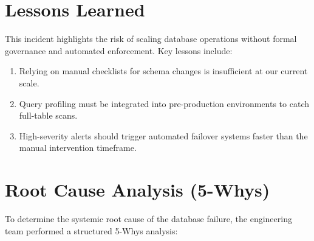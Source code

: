 \documentclass[11pt,a4paper]{article}
\begin{document}
\vspace{0.2cm}

\section{Lessons Learned}
This incident highlights the risk of scaling database operations without formal governance and automated enforcement. Key lessons include:
\begin{enumerate}[label=\textbf{\arabic*.}, leftmargin=15pt, nosep]
  \item Relying on manual checklists for schema changes is insufficient at our current scale.
  \item Query profiling must be integrated into pre-production environments to catch full-table scans.
  \item High-severity alerts should trigger automated failover systems faster than the manual intervention timeframe.
\end{enumerate}

\newpage

\section{Root Cause Analysis (5-Whys)}
To determine the systemic root cause of the database failure, the engineering team performed a structured 5-Whys analysis:
\end{document}

